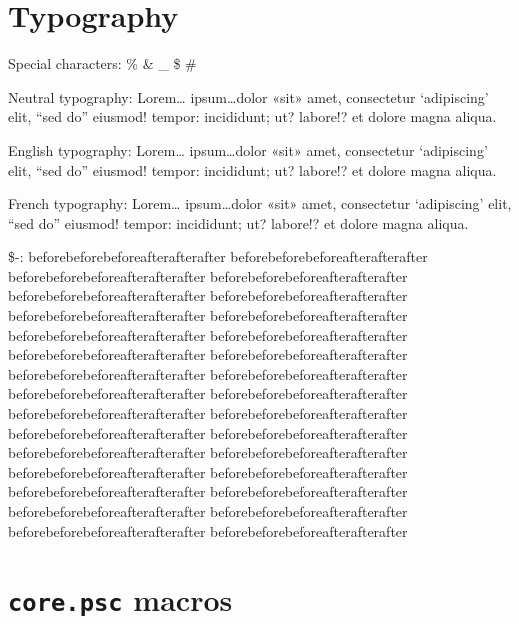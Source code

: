 \documentclass[ebook,demo]{pyscribe}
\begin{document}
\begin{center}
{\LARGE \@maintitle \par}
\end{center}
\makeatother
\newpage

\renewcommand\contentsname{Sommaire}
\tableofcontents



\chapter{Typography}

Special characters: \% \& \_ \$ \#

Neutral typography: Lorem\dots{} ipsum\dots{}dolor «sit» amet, consectetur `adipiscing' elit, “sed do” eiusmod! tempor: incididunt; ut? labore!? et dolore magna aliqua. \par
English typography: Lorem\dots{} ipsum\dots{}dolor «sit» amet, consectetur `adipiscing' elit, “sed do” eiusmod! tempor: incididunt; ut? labore!? et dolore magna aliqua. \par
French typography: Lorem\dots{} ipsum\dots{}dolor «sit» amet, consectetur `adipiscing' elit, “sed do” eiusmod! tempor: incididunt; ut? labore!? et dolore magna aliqua. \par

\par\$-: beforebeforebefore\-afterafterafter beforebeforebefore\-afterafterafter beforebeforebefore\-afterafterafter beforebeforebefore\-afterafterafter beforebeforebefore\-afterafterafter beforebeforebefore\-afterafterafter beforebeforebefore\-afterafterafter beforebeforebefore\-afterafterafter beforebeforebefore\-afterafterafter beforebeforebefore\-afterafterafter 
beforebeforebefore\-afterafterafter beforebeforebefore\-afterafterafter beforebeforebefore\-afterafterafter beforebeforebefore\-afterafterafter beforebeforebefore\-afterafterafter beforebeforebefore\-afterafterafter beforebeforebefore\-afterafterafter beforebeforebefore\-afterafterafter beforebeforebefore\-afterafterafter beforebeforebefore\-afterafterafter 
beforebeforebefore\-afterafterafter beforebeforebefore\-afterafterafter beforebeforebefore\-afterafterafter beforebeforebefore\-afterafterafter beforebeforebefore\-afterafterafter beforebeforebefore\-afterafterafter beforebeforebefore\-afterafterafter beforebeforebefore\-afterafterafter beforebeforebefore\-afterafterafter beforebeforebefore\-afterafterafter 

\chapter{\texttt{core.psc} macros}
\end{document}

